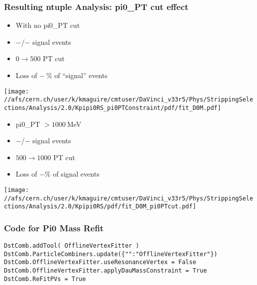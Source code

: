 \documentclass[10pt,a4paper]{beamer}
\begin{document}
\begin{frame}
\frametitle{Resulting ntuple Analysis: pi0\_PT cut effect}
\begin{minipage}{5.25cm}
\begin{itemize}
\item{With no pi0\_PT cut}
\item{$-$/$-$ signal events}
\item{$0 \rightarrow 500$ PT cut}
\item{Loss of $-~$\% of ``signal'' events}
\end{itemize}
\texttt{[image: //afs/cern.ch/user/k/kmaguire/cmtuser/DaVinci\_v33r5/Phys/StrippingSelections/Analysis/2.0/Kpipi0RS\_pi0PTConstraint/pdf/fit\_D0M.pdf]}
\end{minipage}
\hspace{2.0em}
\begin{minipage}{5.25cm}
\begin{itemize}
\item{pi0\_PT $> 1000~$MeV}
\item{$-$/$-$ signal events}
\item{$500 \rightarrow 1000$ PT cut}
\item{Loss of $-$\% of signal events}
\end{itemize}
\texttt{[image: //afs/cern.ch/user/k/kmaguire/cmtuser/DaVinci\_v33r5/Phys/StrippingSelections/Analysis/2.0/Kpipi0RS/pdf/fit\_D0M\_pi0PTcut.pdf]}
\end{minipage}
\end{frame}

\begin{frame}[fragile]
\frametitle{Code for Pi0 Mass Refit}
\begin{flushleft}
\begin{flushleft}
\begin{lstlisting}
DstComb.addTool( OfflineVertexFitter )                                                                                                  
DstComb.ParticleCombiners.update({"":"OfflineVertexFitter"})                                                                                    
DstComb.OfflineVertexFitter.useResonanceVertex = False
DstComb.OfflineVertexFitter.applyDauMassConstraint = True                                                                                      
DstComb.ReFitPVs = True
\end{lstlisting}
\end{flushleft}
\end{flushleft}
\end{frame}
\end{document}
